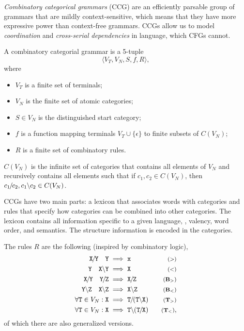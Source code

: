 \textit{Combinatory categorical grammars} (CCG) are an efficiently parsable
group of grammars that are mildly context-sensitive, which means that they have
more expressive power than context-free grammars. CCGs allow us to model
\textit{coordination} and \textit{cross-serial dependencies} in language, which
CFGs cannot.

\begin{definition}

  A combinatory categorial grammar is a 5-tuple \[
  \langle V_T, V_N, S, f, R\rangle
  ,\]
  where
  \begin{itemize}
    \item $V_T$ is a finite set of terminals;
    \item $V_N$ is the finite set of atomic categories;
    \item $S \in V_N$ is the distinguished start category;
    \item $f$ is a function mapping terminals $V_T \cup \{ \epsilon \}$ to
      finite subsets of $C(V_N)$;
    \item $R$ is a finite set of combinatory rules.
  \end{itemize}

  $C(V_N)$ is the infinite set of categories that contains all elements of $V_N$
  and recursively contains all elements such that if $c_1,c_2\in C(V_N)$, then
  $c_1 \kern-1pt /\kern-1pt c_2, c_1 \kern-.3pt \backslash\kern-.2pt c_2 \in C(V_N)$.
\end{definition}

CCGs have two main parts: a lexicon that associates words with categories and
rules that specify how categories can be combined into other categories. The
lexicon contains all information specific to a given language, \ie, valency,
word order, and semantics. The structure information is encoded in the
categories.

The rules $R$ are the following (inspired by combinatory logic),
\begin{align*}
  \cat{X \fs Y} \hspace{1em} \cat{Y} &\implies \cat{x} & \text{\footnotesize $(>)$} \\
  \cat{Y} \hspace{1em} \cat{X \bs Y} &\implies \cat{X} & \text{\footnotesize $(<)$} \\
  \cat{X \fs Y} \hspace{1em} \cat{Y \fs Z} &\implies \cat{X \fs Z} & \text{\footnotesize $(\mathbf{B}_>)$} \\
  \cat{Y \bs Z} \hspace{1em} \cat{X \bs Z} &\implies \cat{X \bs Z} & \text{\footnotesize $(\mathbf{B}_<)$} \\
  \forall \cat{T}\in V_N : \cat{X} &\implies \cat{T \fs (T \bs X)} & \text{\footnotesize $(\mathbf{T}_>)$} \\
  \forall \cat{T}\in V_N : \cat{X} &\implies \cat{T \bs (T \fs X)} & \text{\footnotesize $(\mathbf{T}_<)$}
,\end{align*}
of which there are also generalized versions.

